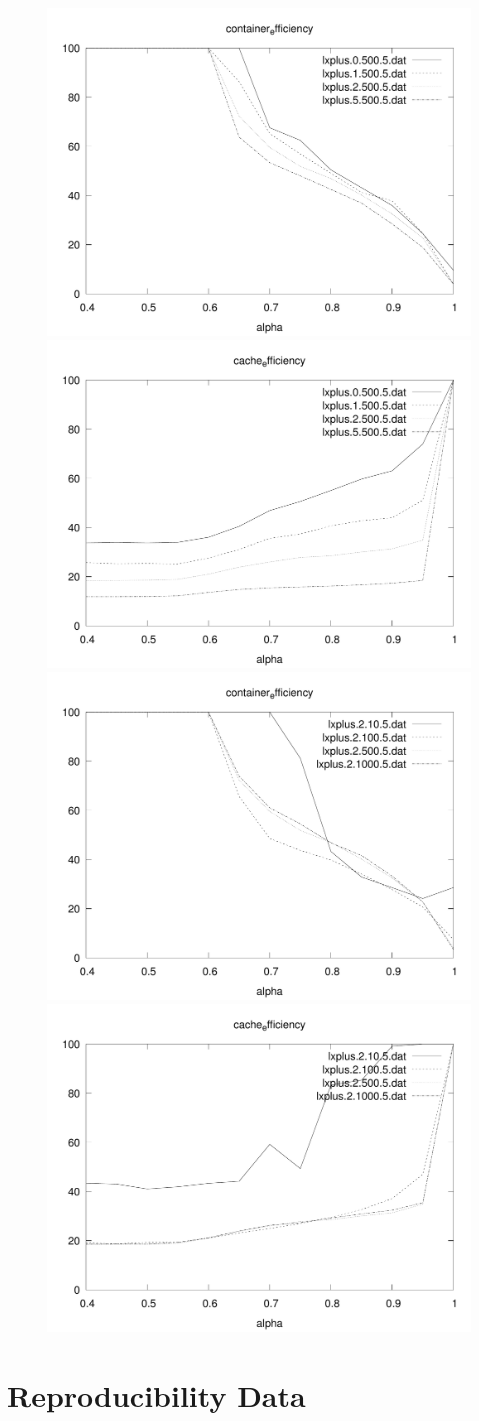 \documentclass[sigconf]{acmart}
\begin{document}
\begin{figure}
\includegraphics[width=0.48\linewidth]{curated/sensitivity/container_efficiency_cache_percent_plt.pdf}
\includegraphics[width=0.48\linewidth]{curated/sensitivity/cache_efficiency_cache_percent_plt.pdf}
\includegraphics[width=0.48\linewidth]{curated/sensitivity/container_efficiency_request_percent_plt.pdf}
\includegraphics[width=0.48\linewidth]{curated/sensitivity/cache_efficiency_request_percent_plt.pdf}
\caption{}
\end{figure}

\section{Reproducibility Data}
\end{document}

